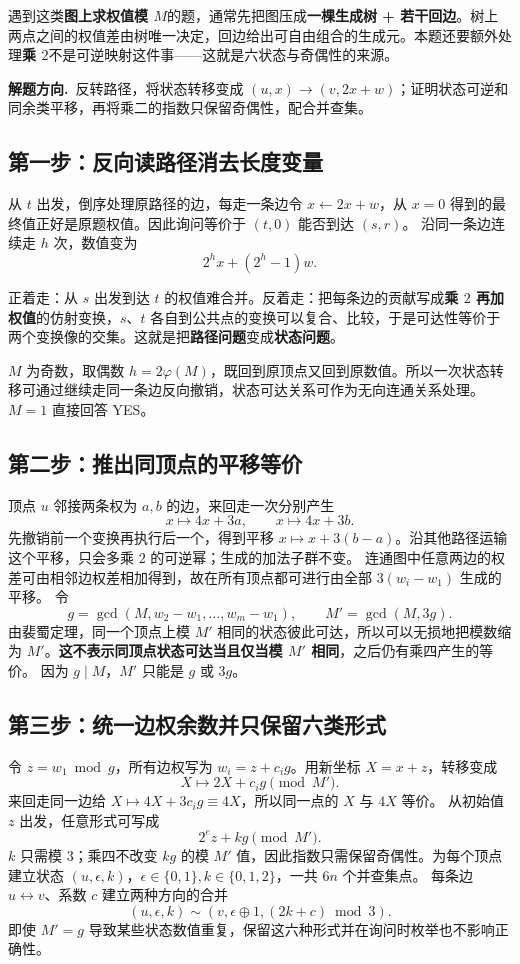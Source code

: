 \documentclass[UTF8,a4paper,11pt,twoside,openright,fontset=fandol]{ctexbook}
\theoremstyle{definition}
\newcommand{\hint}{\par\noindent\textbf{解题方向.}\ }
\begin{document}
\begin{tip}
遇到这类\textbf{图上求权值模 $M$}的题，通常先把图压成\textbf{一棵生成树 + 若干回边}。树上两点之间的权值差由树唯一决定，回边给出可自由组合的生成元。本题还要额外处理\textbf{乘 $2$}不是可逆映射这件事——这就是六状态与奇偶性的来源。
\end{tip}

\hint 反转路径，将状态转移变成 $(u,x)\to(v,2x+w)$；证明状态可逆和同余类平移，再将乘二的指数只保留奇偶性，配合并查集。

\subsection{第一步：反向读路径消去长度变量}
从 $t$ 出发，倒序处理原路径的边，每走一条边令 $x\gets2x+w$，从 $x=0$ 得到的最终值正好是原题权值。因此询问等价于 $(t,0)$ 能否到达 $(s,r)$。
沿同一条边连续走 $h$ 次，数值变为
\[
 2^hx+(2^h-1)w.
\]

\begin{tip}
正着走：从 $s$ 出发到达 $t$ 的权值难合并。反着走：把每条边的贡献写成\textbf{乘 $2$ 再加权值}的仿射变换，$s$、$t$ 各自到公共点的变换可以复合、比较，于是可达性等价于两个变换像的交集。这就是把\textbf{路径问题}变成\textbf{状态问题}。
\end{tip}

$M$ 为奇数，取偶数 $h=2\varphi(M)$，既回到原顶点又回到原数值。所以一次状态转移可通过继续走同一条边反向撤销，状态可达关系可作为无向连通关系处理。$M=1$ 直接回答 YES。

\subsection{第二步：推出同顶点的平移等价}
顶点 $u$ 邻接两条权为 $a,b$ 的边，来回走一次分别产生
\[
 x\mapsto4x+3a,\qquad x\mapsto4x+3b.
\]
先撤销前一个变换再执行后一个，得到平移 $x\mapsto x+3(b-a)$。沿其他路径运输这个平移，只会多乘 $2$ 的可逆幂；生成的加法子群不变。
连通图中任意两边的权差可由相邻边权差相加得到，故在所有顶点都可进行由全部 $3(w_i-w_1)$ 生成的平移。
令
\[
 g=\gcd(M,w_2-w_1,\ldots,w_m-w_1),\qquad M'=\gcd(M,3g).
\]
由裴蜀定理，同一个顶点上模 $M'$ 相同的状态彼此可达，所以可以无损地把模数缩为 $M'$。\textbf{这不表示同顶点状态可达当且仅当模 $M'$ 相同}，之后仍有乘四产生的等价。
因为 $g\mid M$，$M'$ 只能是 $g$ 或 $3g$。

\subsection{第三步：统一边权余数并只保留六类形式}
令 $z=w_1\bmod g$，所有边权写为 $w_i=z+c_ig$。用新坐标 $X=x+z$，转移变成
\[
 X\mapsto2X+c_ig\pmod{M'}.
\]
来回走同一边给 $X\mapsto4X+3c_ig\equiv4X$，所以同一点的 $X$ 与 $4X$ 等价。
从初始值 $z$ 出发，任意形式可写成
\[
 2^ez+kg\pmod{M'}.
\]
$k$ 只需模 $3$；乘四不改变 $kg$ 的模 $M'$ 值，因此指数只需保留奇偶性。为每个顶点建立状态 $(u,\epsilon,k)$，$\epsilon\in\{0,1\},k\in\{0,1,2\}$，一共 $6n$ 个并查集点。
每条边 $u\leftrightarrow v$、系数 $c$ 建立两种方向的合并
\[
 (u,\epsilon,k)\sim(v,\epsilon\oplus1,(2k+c)\bmod3).
\]
即使 $M'=g$ 导致某些状态数值重复，保留这六种形式并在询问时枚举也不影响正确性。
\end{document}
